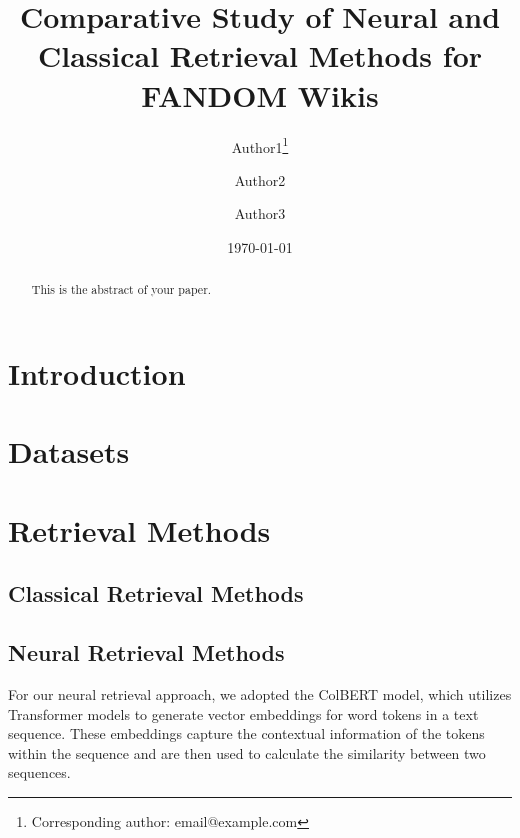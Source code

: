\documentclass{article}
\title{Comparative Study of Neural and Classical Retrieval Methods for FANDOM Wikis}
\author{Author1\thanks{Corresponding author: email@example.com} \and Author2 \and Author3}
\date{\today}
\begin{document}
\maketitle

\begin{abstract}
This is the abstract of your paper.
\end{abstract}

\section{Introduction}

\section{Datasets}

\section{Retrieval Methods}
\subsection{Classical Retrieval Methods}

\subsection{Neural Retrieval Methods}
For our neural retrieval approach, we adopted the ColBERT \cite{khattab2020colbert} model, which utilizes Transformer models to generate vector embeddings for word tokens in a text sequence. These embeddings capture the contextual information of the tokens within the sequence and are then used to calculate the similarity between two sequences.
\end{document}
